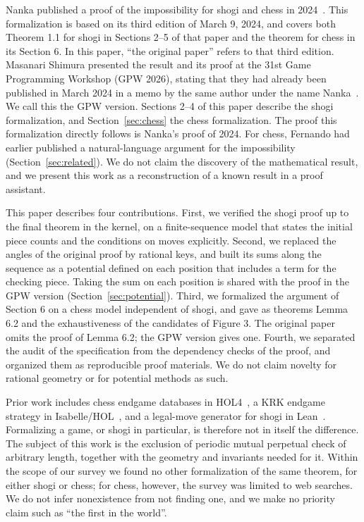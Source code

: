 \documentclass[a4paper,11pt]{article}
\theoremstyle{definition}
\begin{document}
Nanka published a proof of the impossibility for shogi and chess in 2024~\cite{nanka}.
This formalization is based on its third edition of March 9, 2024, and covers both Theorem 1.1 for shogi in Sections 2--5 of that paper and the theorem for chess in its Section 6.
In this paper, ``the original paper'' refers to that third edition.
Masanari Shimura presented the result and its proof at the 31st Game Programming Workshop (GPW 2026), stating that they had already been published in March 2024 in a memo by the same author under the name Nanka~\cite{gpw}.
We call this the GPW version.
Sections 2--4 of this paper describe the shogi formalization, and Section~\ref{sec:chess} the chess formalization.
The proof this formalization directly follows is Nanka's proof of 2024.
For chess, Fernando had earlier published a natural-language argument for the impossibility~\cite{fernando} (Section~\ref{sec:related}).
We do not claim the discovery of the mathematical result, and we present this work as a reconstruction of a known result in a proof assistant.

This paper describes four contributions.
First, we verified the shogi proof up to the final theorem in the kernel, on a finite-sequence model that states the initial piece counts and the conditions on moves explicitly.
Second, we replaced the angles of the original proof by rational keys, and built its sums along the sequence as a potential defined on each position that includes a term for the checking piece.
Taking the sum on each position is shared with the proof in the GPW version (Section~\ref{sec:potential}).
Third, we formalized the argument of Section 6 on a chess model independent of shogi, and gave as theorems Lemma 6.2 and the exhaustiveness of the candidates of Figure 3.
The original paper omits the proof of Lemma 6.2; the GPW version gives one.
Fourth, we separated the audit of the specification from the dependency checks of the proof, and organized them as reproducible proof materials.
We do not claim novelty for rational geometry or for potential methods as such.

Prior work includes chess endgame databases in HOL4~\cite{hurd}, a KRK endgame strategy in Isabelle/HOL~\cite{krk}, and a legal-move generator for shogi in Lean~\cite{yam}.
Formalizing a game, or shogi in particular, is therefore not in itself the difference.
The subject of this work is the exclusion of periodic mutual perpetual check of arbitrary length, together with the geometry and invariants needed for it.
Within the scope of our survey we found no other formalization of the same theorem, for either shogi or chess; for chess, however, the survey was limited to web searches.
We do not infer nonexistence from not finding one, and we make no priority claim such as ``the first in the world''.
\end{document}
